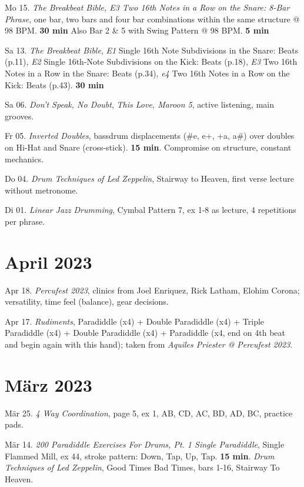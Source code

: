 \documentclass[
]{book}
\begin{document}
Mo 15. \emph{The Breakbeat Bible, E3 Two 16th Notes in a Row on the Snare: 8-Bar Phrase}, one bar, two bars and four bar combinations within the same structure @ 98 BPM. \textbf{30 min} Also Bar 2 \& 5 with Swing Pattern @ 98 BPM. \textbf{5 min}

Sa 13. \emph{The Breakbeat Bible}, \emph{E1} Single 16th Note Subdivisions in the Snare: Beats (p.11), \emph{E2} Single 16th-Note Subdivisions on the Kick: Beats (p.18), \emph{E3} Two 16th Notes in a Row in the Snare: Beats (p.34), \emph{e4} Two 16th Notes in a Row on the Kick: Beats (p.43). \textbf{30 min}

Sa 06. \emph{Don't Speak, No Doubt}, \emph{This Love, Maroon 5}, active listening, main grooves.

Fr 05. \emph{Inverted Doubles}, bassdrum displacements (\#e, e+, +a, a\#) over doubles on Hi-Hat and Snare (cross-stick). \textbf{15 min}. Compromise on structure, constant mechanics.

Do 04. \emph{Drum Techniques of Led Zeppelin}, Stairway to Heaven, first verse lecture without metronome.

Di 01. \emph{Linear Jazz Drumming}, Cymbal Pattern 7, ex 1-8 as lecture, 4 repetitions per phrase.

\hypertarget{april-2023}{%
\section*{April 2023}\label{april-2023}}

Apr 18. \emph{Percufest 2023}, clinics from Joel Enriquez, Rick Latham, Elohim Corona; versatility, time feel (balance), gear decisions.

Apr 17. \emph{Rudiments}, Paradiddle (x4) + Double Paradiddle (x4) + Triple Paradiddle (x4) + Double Paradiddle (x4) + Paradiddle (x4, end on 4th beat and begin again with this hand); taken from \emph{Aquiles Priester @ Percufest 2023}.

\hypertarget{muxe4rz-2023}{%
\section*{März 2023}\label{muxe4rz-2023}}

Mär 25. \emph{4 Way Coordination}, page 5, ex 1, AB, CD, AC, BD, AD, BC, practice pads.

Mär 14. \emph{200 Paradiddle Exercises For Drums, Pt. 1 Single Paradiddle}, Single Flammed Mill, ex 44, stroke pattern: Down, Tap, Up, Tap. \textbf{15 min}. \emph{Drum Techniques of Led Zeppelin}, Good Times Bad Times, bars 1-16, Stairway To Heaven.
\end{document}
